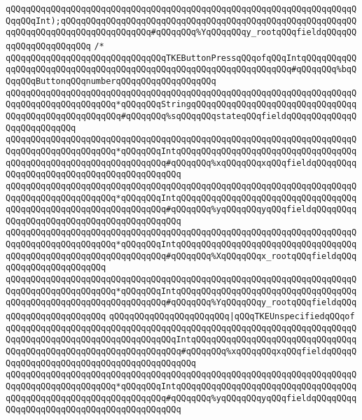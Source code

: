 \verb|qQQqqQQqqQQqqQQqqQQqqQQqqQQqqQQqqQQqqQQqqQQqqQQqqQQqqQQqqQQqqQQqqQQqqQQqqQQqInt);qQQqqQQqqQQqqQQqqQQqqQQqqQQqqQQqqQQqqQQqqQQqqQQqqQQqqQQqqQQqqQQqqQQqqQQqqQQqqQQqqQQqqQQq#qQQqqQQq%YqQQqqQQqy_rootqQQqfieldqQQqqQQqqQQqqQQqqQQqqQQq|\newline
\verb|/*|\newline
\verb|qQQqqQQqqQQqqQQqqQQqqQQqqQQqqQQqTKEButtonPressqQQqofqQQqIntqQQqqQQqqQQqqQQqqQQqqQQqqQQqqQQqqQQqqQQqqQQqqQQqqQQqqQQqqQQqqQQqqQQq#qQQqqQQq%bqQQqqQQqButtonqQQqnumberqQQqqQQqqQQqqQQqqQQq|\newline
\verb|qQQqqQQqqQQqqQQqqQQqqQQqqQQqqQQqqQQqqQQqqQQqqQQqqQQqqQQqqQQqqQQqqQQqqQQqqQQqqQQqqQQqqQQqqQQq*qQQqqQQqStringqQQqqQQqqQQqqQQqqQQqqQQqqQQqqQQqqQQqqQQqqQQqqQQqqQQqqQQq#qQQqqQQq%sqQQqqQQqstateqQQqfieldqQQqqQQqqQQqqQQqqQQqqQQqqQQq|\newline
\verb|qQQqqQQqqQQqqQQqqQQqqQQqqQQqqQQqqQQqqQQqqQQqqQQqqQQqqQQqqQQqqQQqqQQqqQQqqQQqqQQqqQQqqQQqqQQq*qQQqqQQqIntqQQqqQQqqQQqqQQqqQQqqQQqqQQqqQQqqQQqqQQqqQQqqQQqqQQqqQQqqQQqqQQqqQQq#qQQqqQQq%xqQQqqQQqxqQQqfieldqQQqqQQqqQQqqQQqqQQqqQQqqQQqqQQqqQQqqQQqqQQq|\newline
\verb|qQQqqQQqqQQqqQQqqQQqqQQqqQQqqQQqqQQqqQQqqQQqqQQqqQQqqQQqqQQqqQQqqQQqqQQqqQQqqQQqqQQqqQQqqQQq*qQQqqQQqIntqQQqqQQqqQQqqQQqqQQqqQQqqQQqqQQqqQQqqQQqqQQqqQQqqQQqqQQqqQQqqQQqqQQq#qQQqqQQq%yqQQqqQQqyqQQqfieldqQQqqQQqqQQqqQQqqQQqqQQqqQQqqQQqqQQqqQQqqQQq|\newline
\verb|qQQqqQQqqQQqqQQqqQQqqQQqqQQqqQQqqQQqqQQqqQQqqQQqqQQqqQQqqQQqqQQqqQQqqQQqqQQqqQQqqQQqqQQqqQQq*qQQqqQQqIntqQQqqQQqqQQqqQQqqQQqqQQqqQQqqQQqqQQqqQQqqQQqqQQqqQQqqQQqqQQqqQQqqQQq#qQQqqQQq%XqQQqqQQqx_rootqQQqfieldqQQqqQQqqQQqqQQqqQQqqQQq|\newline
\verb|qQQqqQQqqQQqqQQqqQQqqQQqqQQqqQQqqQQqqQQqqQQqqQQqqQQqqQQqqQQqqQQqqQQqqQQqqQQqqQQqqQQqqQQqqQQq*qQQqqQQqIntqQQqqQQqqQQqqQQqqQQqqQQqqQQqqQQqqQQqqQQqqQQqqQQqqQQqqQQqqQQqqQQqqQQq#qQQqqQQq%YqQQqqQQqy_rootqQQqfieldqQQqqQQqqQQqqQQqqQQqqQQq|\newline
\verb|qQQqqQQqqQQqqQQqqQQqqQQq|\verb#|qQQqTKEUnspecifiedqQQqof#\newline
\verb|qQQqqQQqqQQqqQQqqQQqqQQqqQQqqQQqqQQqqQQqqQQqqQQqqQQqqQQqqQQqqQQqqQQqqQQqqQQqqQQqqQQqqQQqqQQqqQQqqQQqqQQqIntqQQqqQQqqQQqqQQqqQQqqQQqqQQqqQQqqQQqqQQqqQQqqQQqqQQqqQQqqQQqqQQqqQQq#qQQqqQQq%xqQQqqQQqxqQQqfieldqQQqqQQqqQQqqQQqqQQqqQQqqQQqqQQqqQQqqQQqqQQq|\newline
\verb|qQQqqQQqqQQqqQQqqQQqqQQqqQQqqQQqqQQqqQQqqQQqqQQqqQQqqQQqqQQqqQQqqQQqqQQqqQQqqQQqqQQqqQQqqQQq*qQQqqQQqIntqQQqqQQqqQQqqQQqqQQqqQQqqQQqqQQqqQQqqQQqqQQqqQQqqQQqqQQqqQQqqQQqqQQq#qQQqqQQq%yqQQqqQQqyqQQqfieldqQQqqQQqqQQqqQQqqQQqqQQqqQQqqQQqqQQqqQQqqQQq|\newline
